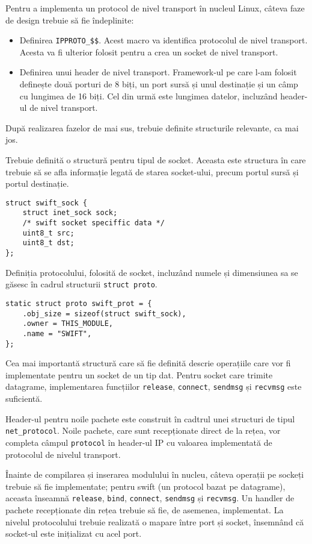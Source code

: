 Pentru a implementa un protocol de nivel transport în nucleul Linux, câteva
faze de design trebuie să fie îndeplinite:

\begin{itemize}
  \item Definirea \texttt{IPPROTO\_\$\$}. Acest macro va identifica protocolul
  de nivel transport. Acesta va fi ulterior folosit pentru a crea un socket de
  nivel transport.
  \item Definirea unui header de nivel transport. Framework-ul pe care l-am
  folosit definește două porturi de 8 biți, un port sursă și unul destinație
  și un câmp cu lungimea de 16 biți. Cel din urmă este lungimea datelor,
  incluzând header-ul de nivel transport.
\end{itemize}

După realizarea fazelor de mai sus, trebuie definite structurile relevante, ca
mai jos.

Trebuie definită o structură pentru tipul de socket. Aceasta este structura în
care trebuie să se afla informație legată de starea socket-ului, precum portul
sursă și portul destinație.

\begin{verbatim}
struct swift_sock {
    struct inet_sock sock;
    /* swift socket speciffic data */
    uint8_t src;
    uint8_t dst;
};
\end{verbatim}

Definiția protocolului, folosită de socket, incluzând numele și dimensiunea sa
se găsesc în cadrul structurii \texttt{struct proto}.

\begin{verbatim}
static struct proto swift_prot = {
    .obj_size = sizeof(struct swift_sock),
    .owner = THIS_MODULE,
    .name = "SWIFT",
};
\end{verbatim}

Cea mai importantă structură care să fie definită descrie operațiile care vor
fi implementate pentru un socket de un tip dat. Pentru socket care trimite
datagrame, implementarea funcțiilor \texttt{release}, \texttt{connect},
\texttt{sendmsg} și \texttt{recvmsg} este suficientă.

Header-ul pentru noile pachete este construit în cadtrul unei structuri de
tipul \texttt{net\_protocol}. Noile pachete, care sunt recepționate direct de
la rețea, vor completa câmpul \texttt{protocol} în header-ul IP cu valoarea
implementată de protocolul de nivelul transport.

Înainte de compilarea și inserarea modulului în nucleu, câteva operații pe
sockeți trebuie să fie implementate; pentru swift (un protocol bazat pe
datagrame), aceasta înseamnă \texttt{release}, \texttt{bind}, \texttt{connect},
\texttt{sendmsg} și \texttt{recvmsg}. Un handler de pachete recepționate din
rețea trebuie să fie, de asemenea, implementat. La nivelul protocolului
trebuie realizată o mapare între port și socket, însemnând că socket-ul este
inițializat cu acel port.

